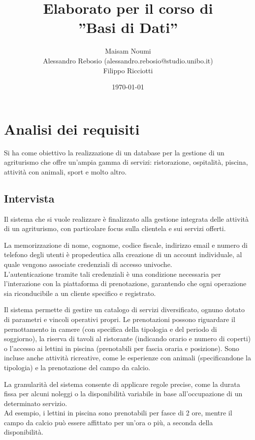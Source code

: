 \documentclass[a4paper,11pt]{report}
\title{Elaborato per il corso di\\''Basi di Dati''}
\author{
    Maisam Noumi\\
    Alessandro Rebosio (alessandro.rebosio@studio.unibo.it)\\
    Filippo Ricciotti
}
\date{\today}
\begin{document}
\maketitle

\tableofcontents

\chapter{Analisi dei requisiti}
Si ha come obiettivo la realizzazione di un database per la gestione di un agriturismo che offre un'ampia gamma di servizi: ristorazione,
ospitalità, piscina, attività con animali, sport e molto altro.

\section{Intervista}
Il sistema che si vuole realizzare è finalizzato alla gestione integrata delle attività di un agriturismo, con particolare focus sulla clientela e sui servizi offerti.

La memorizzazione di nome, cognome, codice fiscale, indirizzo email e numero di telefono degli utenti è propedeutica alla creazione di un account individuale, 
al quale vengono associate credenziali di accesso univoche. 
\\L'autenticazione tramite tali credenziali è una condizione necessaria per l'interazione con la piattaforma di prenotazione, 
garantendo che ogni operazione sia riconducibile a un cliente specifico e registrato.

Il sistema permette di gestire un catalogo di servizi diversificato, ognuno dotato di parametri e vincoli operativi propri. 
Le prenotazioni possono riguardare il pernottamento in camere (con specifica della tipologia e del periodo di soggiorno), la riserva di tavoli al ristorante (indicando orario e numero di coperti) o l'accesso ai lettini in piscina (prenotabili per fascia oraria e posizione). 
Sono incluse anche attività ricreative, come le esperienze con animali (specificandone la tipologia) e la prenotazione del campo da calcio.

La granularità del sistema consente di applicare regole precise, come la durata fissa per alcuni noleggi o la disponibilità variabile in base all'occupazione di un determinato servizio. 
\\Ad esempio, i lettini in piscina sono prenotabili per fasce di 2 ore, mentre il campo da calcio può essere affittato per un'ora o più, a seconda della disponibilità.
\end{document}
